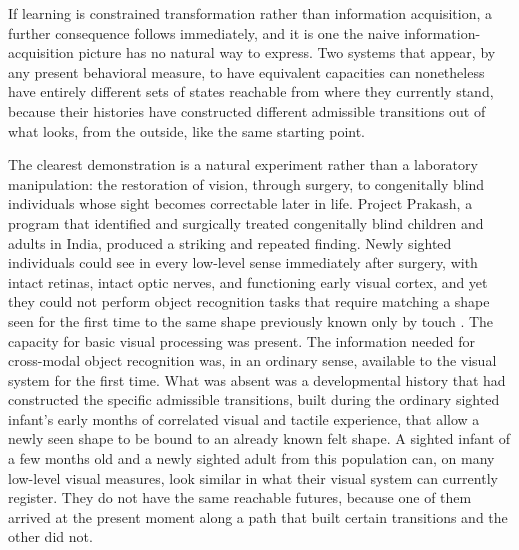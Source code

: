 \documentclass[11pt]{book}
\begin{document}
If learning is constrained transformation rather than information acquisition, a further consequence follows immediately, and it is one the naive information-acquisition picture has no natural way to express. Two systems that appear, by any present behavioral measure, to have equivalent capacities can nonetheless have entirely different sets of states reachable from where they currently stand, because their histories have constructed different admissible transitions out of what looks, from the outside, like the same starting point.

The clearest demonstration is a natural experiment rather than a laboratory manipulation: the restoration of vision, through surgery, to congenitally blind individuals whose sight becomes correctable later in life. Project Prakash, a program that identified and surgically treated congenitally blind children and adults in India, produced a striking and repeated finding. Newly sighted individuals could see in every low-level sense immediately after surgery, with intact retinas, intact optic nerves, and functioning early visual cortex, and yet they could not perform object recognition tasks that require matching a shape seen for the first time to the same shape previously known only by touch \cite{held2011}. The capacity for basic visual processing was present. The information needed for cross-modal object recognition was, in an ordinary sense, available to the visual system for the first time. What was absent was a developmental history that had constructed the specific admissible transitions, built during the ordinary sighted infant's early months of correlated visual and tactile experience, that allow a newly seen shape to be bound to an already known felt shape. A sighted infant of a few months old and a newly sighted adult from this population can, on many low-level visual measures, look similar in what their visual system can currently register. They do not have the same reachable futures, because one of them arrived at the present moment along a path that built certain transitions and the other did not.
\end{document}
